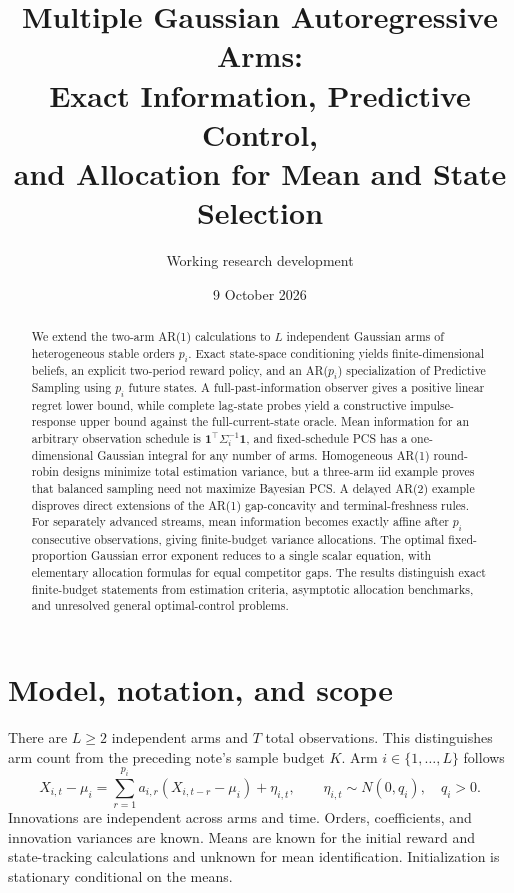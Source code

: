 \documentclass[11pt]{article}
\title{Multiple Gaussian Autoregressive Arms:\\Exact Information, Predictive Control,\\and Allocation for Mean and State Selection}
\author{Working research development}
\date{9 October 2026}
\begin{document}
\maketitle
\begin{abstract}
We extend the two-arm AR(1) calculations to $L$ independent Gaussian arms of heterogeneous stable orders $p_i$. Exact state-space conditioning yields finite-dimensional beliefs, an explicit two-period reward policy, and an AR($p_i$) specialization of Predictive Sampling using $p_i$ future states. A full-past-information observer gives a positive linear regret lower bound, while complete lag-state probes yield a constructive impulse-response upper bound against the full-current-state oracle. Mean information for an arbitrary observation schedule is $\mathbf1^\top\Sigma_i^{-1}\mathbf1$, and fixed-schedule PCS has a one-dimensional Gaussian integral for any number of arms. Homogeneous AR(1) round-robin designs minimize total estimation variance, but a three-arm iid example proves that balanced sampling need not maximize Bayesian PCS. A delayed AR(2) example disproves direct extensions of the AR(1) gap-concavity and terminal-freshness rules. For separately advanced streams, mean information becomes exactly affine after $p_i$ consecutive observations, giving finite-budget variance allocations. The optimal fixed-proportion Gaussian error exponent reduces to a single scalar equation, with elementary allocation formulas for equal competitor gaps. The results distinguish exact finite-budget statements from estimation criteria, asymptotic allocation benchmarks, and unresolved general optimal-control problems.
\end{abstract}

\section{Model, notation, and scope}
There are $L\geq2$ independent arms and $T$ total observations. This distinguishes arm count from the preceding note's sample budget $K$. Arm $i\in\{1,\ldots,L\}$ follows
\begin{equation}
X_{i,t}-\mu_i=\sum_{r=1}^{p_i}a_{i,r}(X_{i,t-r}-\mu_i)+\eta_{i,t},\qquad
\eta_{i,t}\sim N(0,q_i),\quad q_i>0.
\label{eq:ar}
\end{equation}
Innovations are independent across arms and time. Orders, coefficients, and innovation variances are known. Means are known for the initial reward and state-tracking calculations and unknown for mean identification. Initialization is stationary conditional on the means.
\end{document}
